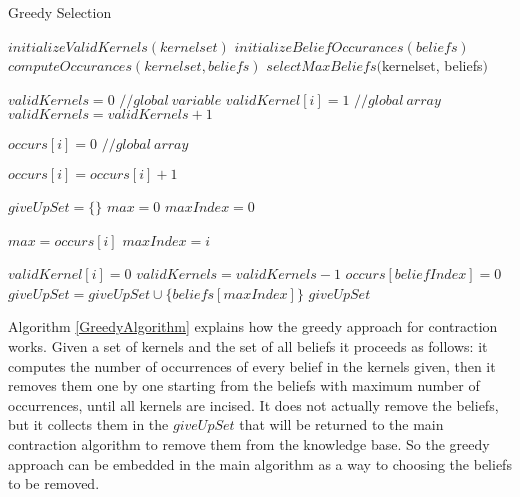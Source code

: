 \begin{algorithm}
\caption{Greedy Selection}
\label{GreedyAlgorithm}
\begin{algorithmic}[1]
\State $initializeValidKernels(kernelset)$
\State $initializeBeliefOccurances(beliefs)$
\State $computeOccurances(kernelset, beliefs)$
\State \Return $selectMaxBeliefs($kernelset, beliefs$)$
\EndFunction
\end{algorithmic}

\begin{algorithmic}[1]
\State $validKernels = 0$ $// global \: variable$
\State $validKernel[i] = 1$  $// global \: array$
\State $validKernels = validKernels + 1$
\EndFor
\EndFunction
\end{algorithmic}

\begin{algorithmic}[1]
\State $occurs[i] = 0$  $// global \: array$
\EndFor
\EndFunction
\end{algorithmic}

\begin{algorithmic}[1]
\State $occurs[i] = occurs[i] + 1$
\EndIf
\EndFor
\EndFor
\EndFunction
\end{algorithmic}

\begin{algorithmic}[1]
\State $giveUpSet = \lbrace \rbrace$
\State $max = 0$
\State $maxIndex = 0$

\State $max = occurs[i]$
\State $maxIndex = i$
\EndIf
\EndFor

\State $validKernel[i] = 0$
\State $validKernels = validKernels - 1$
\EndIf
\EndFor
\State $occurs[beliefIndex] = 0$
\State $giveUpSet = giveUpSet \cup \lbrace beliefs[maxIndex] \rbrace$
\EndWhile
\State \Return $giveUpSet$
\EndFunction
\end{algorithmic}
\end{algorithm}

Algorithm \ref{GreedyAlgorithm} explains how the greedy approach for contraction works. Given a set of kernels and the set of all beliefs it proceeds as follows: it computes the number of occurrences of every belief in the kernels given, then it removes them one by one starting from the beliefs with maximum number of occurrences, until all kernels are incised. It does not actually remove the beliefs, but it collects them in the $giveUpSet$ that will be returned to the main contraction algorithm to remove them from the knowledge base. So the greedy approach can be embedded in the main algorithm as a way to choosing the beliefs to be removed. 

